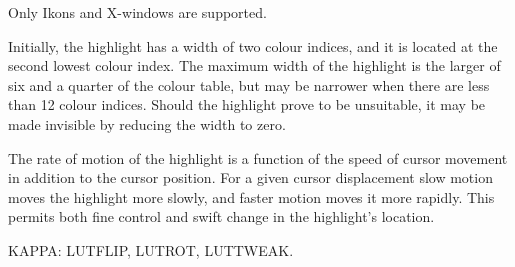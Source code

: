 \documentclass[twoside,11pt]{article}
\newcommand{\sstdiytopic}[2]{\goodbreak \item[{\hspace{-0.35em}#1\hspace{-0.35em}:}] \mbox{} \\[1.3ex] #2}
\newcommand{\sstitem}{\item}
\renewcommand{\sstdiytopic}[2]{\item[{#1}]
      \begin{description}
         #2
      \end{description}
   }
\begin{document}
{{{         \sstitem
         Only Ikons and X-windows are supported.

         \sstitem
         Initially, the highlight has a width of two colour indices,
         and it is located at the second lowest colour index.  The maximum
         width of the highlight is the larger of six and a quarter of the
         colour table, but may be narrower when there are less than 12
         colour indices.  Should the highlight prove to be unsuitable, it
         may be made invisible by reducing the width to zero.

         \sstitem
         The rate of motion of the highlight is a function of the
         speed of cursor movement in addition to the cursor position.
         For a given cursor displacement slow motion moves the highlight
         more slowly, and faster motion moves it more rapidly.  This
         permits both fine control and swift change in the highlight's
         location.
      }
   }
   \sstdiytopic{
      Related Applications
   }{
      KAPPA: LUTFLIP, LUTROT, LUTTWEAK.
   }
}
\end{document}
